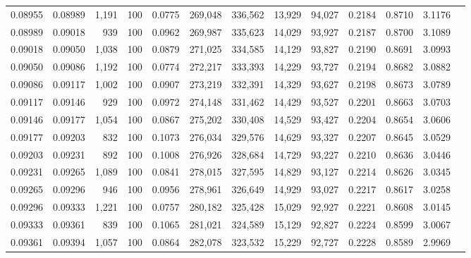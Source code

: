 \begin{tabular}{rrrrrrrrrrrrr}
0.08955 & 0.08989 & 1,191 & 100 &                                     0.0775 & 269,048 & 336,562 &  13,929 &  94,027 & 0.2184 & 0.8710 & 3.1176 \\
0.08989 & 0.09018 &   939 & 100 &                                     0.0962 & 269,987 & 335,623 &  14,029 &  93,927 & 0.2187 & 0.8700 & 3.1089 \\
0.09018 & 0.09050 & 1,038 & 100 &                                     0.0879 & 271,025 & 334,585 &  14,129 &  93,827 & 0.2190 & 0.8691 & 3.0993 \\
0.09050 & 0.09086 & 1,192 & 100 &                                     0.0774 & 272,217 & 333,393 &  14,229 &  93,727 & 0.2194 & 0.8682 & 3.0882 \\
0.09086 & 0.09117 & 1,002 & 100 &                                     0.0907 & 273,219 & 332,391 &  14,329 &  93,627 & 0.2198 & 0.8673 & 3.0789 \\
0.09117 & 0.09146 &   929 & 100 &                                     0.0972 & 274,148 & 331,462 &  14,429 &  93,527 & 0.2201 & 0.8663 & 3.0703 \\
0.09146 & 0.09177 & 1,054 & 100 &                                     0.0867 & 275,202 & 330,408 &  14,529 &  93,427 & 0.2204 & 0.8654 & 3.0606 \\
0.09177 & 0.09203 &   832 & 100 &                                     0.1073 & 276,034 & 329,576 &  14,629 &  93,327 & 0.2207 & 0.8645 & 3.0529 \\
0.09203 & 0.09231 &   892 & 100 &                                     0.1008 & 276,926 & 328,684 &  14,729 &  93,227 & 0.2210 & 0.8636 & 3.0446 \\
0.09231 & 0.09265 & 1,089 & 100 &                                     0.0841 & 278,015 & 327,595 &  14,829 &  93,127 & 0.2214 & 0.8626 & 3.0345 \\
0.09265 & 0.09296 &   946 & 100 &                                     0.0956 & 278,961 & 326,649 &  14,929 &  93,027 & 0.2217 & 0.8617 & 3.0258 \\
0.09296 & 0.09333 & 1,221 & 100 &                                     0.0757 & 280,182 & 325,428 &  15,029 &  92,927 & 0.2221 & 0.8608 & 3.0145 \\
0.09333 & 0.09361 &   839 & 100 &                                     0.1065 & 281,021 & 324,589 &  15,129 &  92,827 & 0.2224 & 0.8599 & 3.0067 \\
0.09361 & 0.09394 & 1,057 & 100 &                                     0.0864 & 282,078 & 323,532 &  15,229 &  92,727 & 0.2228 & 0.8589 & 2.9969 \\

\end{tabular}

